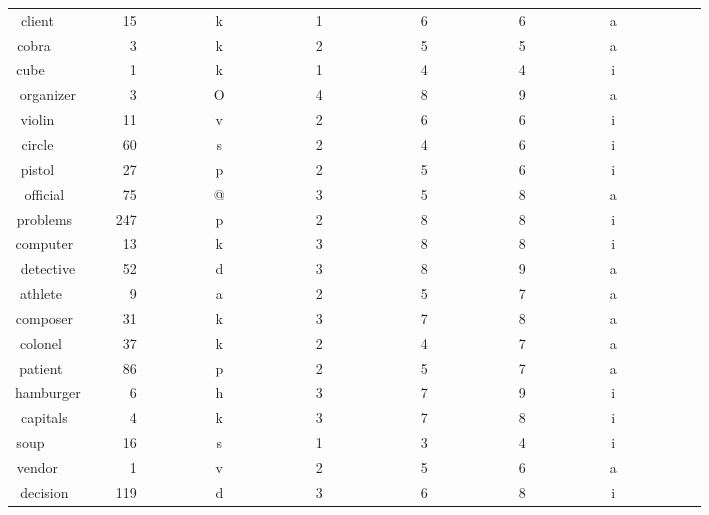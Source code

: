 \begin{longtable}{|c|c|c|c|c|c|c|}
client~~~~~~&~15~~~~~~~~~&k~~~~~~~~~~~&1~~~~~~~~~~~&~6~~~~~~~~~~&~6~~~~~~~~~~&a~~~~~~~~~~~\\ 
cobra~~~~~~~&~~3~~~~~~~~~&k~~~~~~~~~~~&2~~~~~~~~~~~&~5~~~~~~~~~~&~5~~~~~~~~~~&a~~~~~~~~~~~\\ 
cube~~~~~~~~&~~1~~~~~~~~~&k~~~~~~~~~~~&1~~~~~~~~~~~&~4~~~~~~~~~~&~4~~~~~~~~~~&i~~~~~~~~~~~\\ 
organizer~~~&~~3~~~~~~~~~&O~~~~~~~~~~~&4~~~~~~~~~~~&~8~~~~~~~~~~&~9~~~~~~~~~~&a~~~~~~~~~~~\\ 
violin~~~~~~&~11~~~~~~~~~&v~~~~~~~~~~~&2~~~~~~~~~~~&~6~~~~~~~~~~&~6~~~~~~~~~~&i~~~~~~~~~~~\\ 
circle~~~~~~&~60~~~~~~~~~&s~~~~~~~~~~~&2~~~~~~~~~~~&~4~~~~~~~~~~&~6~~~~~~~~~~&i~~~~~~~~~~~\\ 
pistol~~~~~~&~27~~~~~~~~~&p~~~~~~~~~~~&2~~~~~~~~~~~&~5~~~~~~~~~~&~6~~~~~~~~~~&i~~~~~~~~~~~\\ 
official~~~~&~75~~~~~~~~~&@~~~~~~~~~~~&3~~~~~~~~~~~&~5~~~~~~~~~~&~8~~~~~~~~~~&a~~~~~~~~~~~\\ 
problems~~~~&247~~~~~~~~~&p~~~~~~~~~~~&2~~~~~~~~~~~&~8~~~~~~~~~~&~8~~~~~~~~~~&i~~~~~~~~~~~\\ 
computer~~~~&~13~~~~~~~~~&k~~~~~~~~~~~&3~~~~~~~~~~~&~8~~~~~~~~~~&~8~~~~~~~~~~&i~~~~~~~~~~~\\ 
detective~~~&~52~~~~~~~~~&d~~~~~~~~~~~&3~~~~~~~~~~~&~8~~~~~~~~~~&~9~~~~~~~~~~&a~~~~~~~~~~~\\ 
athlete~~~~~&~~9~~~~~~~~~&a~~~~~~~~~~~&2~~~~~~~~~~~&~5~~~~~~~~~~&~7~~~~~~~~~~&a~~~~~~~~~~~\\ 
composer~~~~&~31~~~~~~~~~&k~~~~~~~~~~~&3~~~~~~~~~~~&~7~~~~~~~~~~&~8~~~~~~~~~~&a~~~~~~~~~~~\\ 
colonel~~~~~&~37~~~~~~~~~&k~~~~~~~~~~~&2~~~~~~~~~~~&~4~~~~~~~~~~&~7~~~~~~~~~~&a~~~~~~~~~~~\\ 
patient~~~~~&~86~~~~~~~~~&p~~~~~~~~~~~&2~~~~~~~~~~~&~5~~~~~~~~~~&~7~~~~~~~~~~&a~~~~~~~~~~~\\ 
hamburger~~~&~~6~~~~~~~~~&h~~~~~~~~~~~&3~~~~~~~~~~~&~7~~~~~~~~~~&~9~~~~~~~~~~&i~~~~~~~~~~~\\ 
capitals~~~~&~~4~~~~~~~~~&k~~~~~~~~~~~&3~~~~~~~~~~~&~7~~~~~~~~~~&~8~~~~~~~~~~&i~~~~~~~~~~~\\ 
soup~~~~~~~~&~16~~~~~~~~~&s~~~~~~~~~~~&1~~~~~~~~~~~&~3~~~~~~~~~~&~4~~~~~~~~~~&i~~~~~~~~~~~\\ 
vendor~~~~~~&~~1~~~~~~~~~&v~~~~~~~~~~~&2~~~~~~~~~~~&~5~~~~~~~~~~&~6~~~~~~~~~~&a~~~~~~~~~~~\\ 
decision~~~~&119~~~~~~~~~&d~~~~~~~~~~~&3~~~~~~~~~~~&~6~~~~~~~~~~&~8~~~~~~~~~~&i~~~~~~~~~~~\\ 

\end{longtable}
